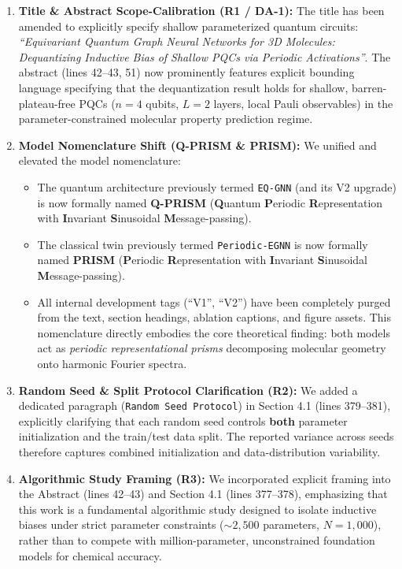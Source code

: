 \documentclass[10pt,letterpaper]{article}
\begin{document}
\begin{enumerate}
    \item \textbf{Title \& Abstract Scope-Calibration (R1 / DA-1):} 
    The title has been amended to explicitly specify shallow parameterized quantum circuits: 
    \textit{``Equivariant Quantum Graph Neural Networks for 3D Molecules: Dequantizing Inductive Bias of Shallow PQCs via Periodic Activations''}. 
    The abstract (lines 42--43, 51) now prominently features explicit bounding language specifying that the dequantization result holds for shallow, barren-plateau-free PQCs ($n=4$ qubits, $L=2$ layers, local Pauli observables) in the parameter-constrained molecular property prediction regime.
    
    \item \textbf{Model Nomenclature Shift (Q-PRISM \& PRISM):} 
    We unified and elevated the model nomenclature:
    \begin{itemize}
        \item The quantum architecture previously termed \texttt{EQ-GNN} (and its V2 upgrade) is now formally named \textbf{Q-PRISM} (\textbf{Q}uantum \textbf{P}eriodic \textbf{R}epresentation with \textbf{I}nvariant \textbf{S}inusoidal \textbf{M}essage-passing).
        \item The classical twin previously termed \texttt{Periodic-EGNN} is now formally named \textbf{PRISM} (\textbf{P}eriodic \textbf{R}epresentation with \textbf{I}nvariant \textbf{S}inusoidal \textbf{M}essage-passing).
        \item All internal development tags (``V1'', ``V2'') have been completely purged from the text, section headings, ablation captions, and figure assets. This nomenclature directly embodies the core theoretical finding: both models act as \textit{periodic representational prisms} decomposing molecular geometry onto harmonic Fourier spectra.
    \end{itemize}
    
    \item \textbf{Random Seed \& Split Protocol Clarification (R2):} 
    We added a dedicated paragraph (\texttt{Random Seed Protocol}) in Section 4.1 (lines 379--381), explicitly clarifying that each random seed controls \textbf{both} parameter initialization and the train/test data split. The reported variance across seeds therefore captures combined initialization and data-distribution variability.
    
    \item \textbf{Algorithmic Study Framing (R3):} 
    We incorporated explicit framing into the Abstract (lines 42--43) and Section 4.1 (lines 377--378), emphasizing that this work is a fundamental algorithmic study designed to isolate inductive biases under strict parameter constraints ($\sim 2{,}500$ parameters, $N=1{,}000$), rather than to compete with million-parameter, unconstrained foundation models for chemical accuracy.
    

\end{enumerate}
\end{document}
